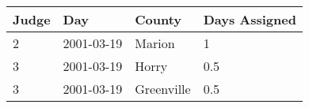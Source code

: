 
\begin{tabular}{|l|l|l|l|}
\hline
\textbf{Judge} & \textbf{Day} & \textbf{County} & \textbf{Days Assigned} \\ \hline
2              & 2001-03-19   & Marion          & 1 \\ \hline
3              & 2001-03-19   & Horry           & 0.5 \\ \hline
3              & 2001-03-19   & Greenville      & 0.5\\ \hline
\end{tabular}
